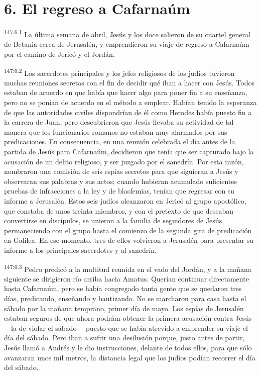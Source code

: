 \section*{6. El regreso a Cafarnaúm}
\par
\textsuperscript{147:6.1} La última semana de abril, Jesús y los doce salieron de su cuartel general de Betania cerca de Jerusalén, y emprendieron su viaje de regreso a Cafarnaúm por el camino de Jericó y el Jordán.

\par
\textsuperscript{147:6.2} Los sacerdotes principales y los jefes religiosos de los judíos tuvieron muchas reuniones secretas con el fin de decidir qué iban a hacer con Jesús. Todos estaban de acuerdo en que había que hacer algo para poner fin a su enseñanza, pero no se ponían de acuerdo en el método a emplear. Habían tenido la esperanza de que las autoridades civiles dispondrían de él como Herodes había puesto fin a la carrera de Juan, pero descubrieron que Jesús llevaba su actividad de tal manera que los funcionarios romanos no estaban muy alarmados por sus predicaciones. En consecuencia, en una reunión celebrada el día antes de la partida de Jesús para Cafarnaúm, decidieron que tenía que ser capturado bajo la acusación de un delito religioso, y ser juzgado por el sanedrín. Por esta razón, nombraron una comisión de seis espías secretos para que siguieran a Jesús y observaran sus palabras y sus actos; cuando hubieran acumulado suficientes pruebas de infracciones a la ley y de blasfemias, tenían que regresar con su informe a Jerusalén. Estos seis judíos alcanzaron en Jericó al grupo apostólico, que constaba de unos treinta miembros, y con el pretexto de que deseaban convertirse en discípulos, se unieron a la familia de seguidores de Jesús, permaneciendo con el grupo hasta el comienzo de la segunda gira de predicación en Galilea. En ese momento, tres de ellos volvieron a Jerusalén para presentar su informe a los principales sacerdotes y al sanedrín.

\par
\textsuperscript{147:6.3} Pedro predicó a la multitud reunida en el vado del Jordán, y a la mañana siguiente se dirigieron río arriba hacia Amatus. Querían continuar directamente hasta Cafarnaúm, pero se había congregado tanta gente que se quedaron tres días, predicando, enseñando y bautizando. No se marcharon para casa hasta el sábado por la mañana temprano, primer día de mayo. Los espías de Jerusalén estaban seguros de que ahora podrían obtener la primera acusación contra Jesús ---la de violar el sábado--- puesto que se había atrevido a emprender su viaje el día del sábado. Pero iban a sufrir una desilusión porque, justo antes de partir, Jesús llamó a Andrés y le dio instrucciones, delante de todos ellos, para que sólo avanzaran unos mil metros, la distancia legal que los judíos podían recorrer el día del sábado.

